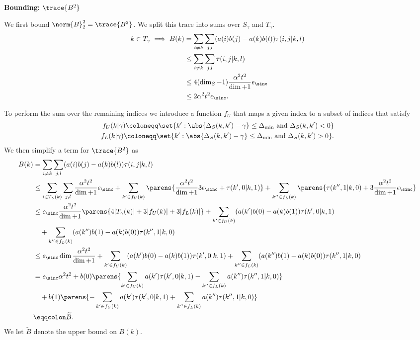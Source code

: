     
    \noindent \textbf{Bounding: }$\trace{B^2}$
    
    
    We first bound $\norm{B}_2^2 = \trace{B^2}$. We split this trace into sums over $S_{\gamma}$ and $T_{\gamma}$. 
    \begin{align}
        k \in T_{\gamma} \implies B(k) &= \sum_{i \neq k} \sum_{j,l} (a(i) b(j) - a(k) b(l)) \tau(i,j|k,l) \\
        &\leq \sum_{i \neq k} \sum_{j,l} \tau(i,j|k,l) \\
        &\leq 4 (\dim_S - 1) \frac{\alpha^2 t^2}{\dim + 1}\epsilon_{\sinc} \\
        &\leq 2 \alpha^2 t^2 \epsilon_{\sinc}.
    \end{align}
    
    
    To perform the sum over the remaining indices we introduce a function $f_U$ that maps a given index to a subset of indices that satisfy
    \begin{align}
        f_U(k | \gamma) \coloneqq \set{k' : \abs{\Delta_S(k, k') - \gamma} \leq \Delta_{\min} \text{ and } \Delta_S(k,k') < 0} \\
        f_L(k | \gamma) \coloneqq \set{k' : \abs{\Delta_S(k, k') - \gamma} \leq \Delta_{\min} \text{ and } \Delta_S(k, k') > 0}.
    \end{align}
    We then simplify a term for $\trace{B^2}$ as
    \begin{align}
        B(k) &= \sum_{i \neq k} \sum_{j,l} (a(i) b(j) - a(k) b(l)) \tau(i,j|k,l) \\
        &\leq \sum_{i \in T_{\gamma}(k)} \sum_{j,l} \frac{\alpha^2 t^2}{\dim + 1}\epsilon_{\sinc} + \sum_{k' \in f_U(k)} \parens{\frac{\alpha^2 t^2}{\dim + 1} 3 \epsilon_{\sinc} + \tau(k', 0 | k, 1)} + \sum_{k'' \in f_L(k)} \parens{\tau(k'', 1 | k, 0) + 3\frac{\alpha^2 t^2}{\dim + 1} \epsilon_{\sinc}} \\
        &\leq \epsilon_{\sinc}\frac{\alpha^2 t^2}{\dim + 1} \parens{4 |T_{\gamma}(k)| + 3 | f_U(k)| + 3 |f_L(k)|} + \sum_{k' \in f_U(k)} (a(k')b(0) - a(k) b(1))\tau(k', 0| k, 1) \nonumber \\
        &\quad + \sum_{k'' \in f_L(k)} (a(k'') b(1) - a(k) b(0))\tau(k'', 1| k, 0) \\
        &\leq \epsilon_{\sinc} \dim \frac{\alpha^2 t^2}{\dim + 1} + \sum_{k' \in f_U(k)} (a(k')b(0) - a(k) b(1))\tau(k', 0| k, 1) + \sum_{k'' \in f_L(k)} (a(k'') b(1) - a(k) b(0))\tau(k'', 1| k, 0) \\
        &= \epsilon_{\sinc}\alpha^2 t^2 + b(0) \parens{\sum_{k' \in f_U(k)} a(k') \tau(k', 0 | k, 1) - \sum_{k'' \in f_L(k)} a(k'') \tau(k'', 1| k, 0)} \nonumber \\
        &\quad + b(1) \parens{-\sum_{k' \in f_U(k)} a(k') \tau(k', 0 | k, 1) + \sum_{k'' \in f_L(k)} a(k'') \tau(k'', 1| k, 0)} \\
        &\eqqcolon \widetilde{B}.
    \end{align}
    We let $\widetilde{B}$ denote the upper bound on $B(k)$. 
    
